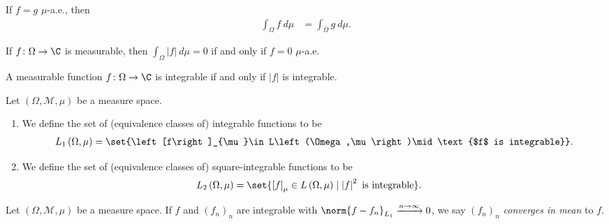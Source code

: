 \begin{fact}
  If $f = g$ $\mu$-a.e., then
  \begin{align*}
    \int_{\Omega}^{} f\:d\mu &= \int_{\Omega}^{} g\:d\mu.
  \end{align*}
\end{fact}
\begin{fact}
  If $f\colon \Omega\rightarrow \C$ is measurable, then $\int_{\Omega}^{} \left\vert f \right\vert\:d\mu = 0$ if and only if $f = 0$ $\mu$-a.e.
\end{fact}
\begin{fact}
  A measurable function $f\colon \Omega\rightarrow \C$ is integrable if and only if $\left\vert f \right\vert$ is integrable.
\end{fact}
\begin{definition}
  Let $\left(\Omega,\mathcal{M},\mu\right)$ be a measure space.
  \begin{enumerate}[(1)]
    \item We define the set of (equivalence classes of) integrable functions to be
      \begin{align*}
        L_{1}\left(\Omega,\mu\right) = \set{\left[f\right]_{\mu}\in L\left(\Omega,\mu\right)\mid \text{$f$ is integrable}}.
      \end{align*}
    \item We define the set of (equivalence classes of) square-integrable functions to be
      \begin{align*}
        L_{2}\left(\Omega,\mu\right) &= \set{\left[f\right]_{\mu}\in L\left(\Omega,\mu\right)\mid \left\vert f \right\vert^2\text{ is integrable}}.
      \end{align*}
  \end{enumerate}
\end{definition}
\begin{definition}
  Let $\left(\Omega,\mathcal{M},\mu\right)$ be a measure space. If $f$ and $\left(f_n\right)_n$ are integrable with $\norm{f-f_n}_{L_1}\xrightarrow{n\rightarrow\infty}0$, we say $\left(f_n\right)_n$ \textit{converges in mean} to $f$.
\end{definition}

